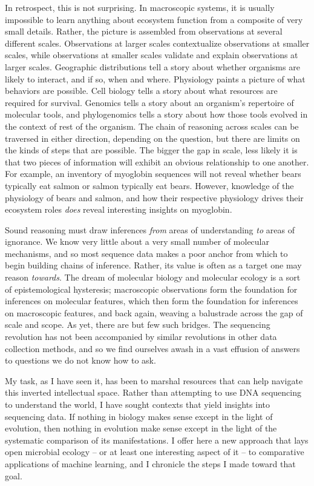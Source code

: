 In retrospect, this is not surprising. In macroscopic systems, it is usually impossible to learn anything about ecosystem function from a composite of very small details. Rather, the picture is assembled from observations at several different scales. Observations at larger scales contextualize observations at smaller scales, while observations at smaller scales validate and explain observations at larger scales. Geographic distributions tell a story about whether organisms are likely to interact, and if so, when and where. Physiology paints a picture of what behaviors are possible. Cell biology tells a story about what resources are required for survival. Genomics tells a story about an organism's repertoire of molecular tools, and phylogenomics tells a story about how those tools evolved in the context of rest of the organism. The chain of reasoning across scales can be traversed in either direction, depending on the question, but there are limits on the kinds of steps that are possible. The bigger the gap in scale, less likely it is that two pieces of information will exhibit an obvious relationship to one another. For example, an inventory of myoglobin sequences will not reveal whether bears typically eat salmon or salmon typically eat bears. However, knowledge of the physiology of bears and salmon, and how their respective physiology drives their ecosystem roles {\em does} reveal interesting insights on myoglobin.

Sound reasoning must draw inferences {\em from} areas of understanding {\em to} areas of ignorance. We know very little about a very small number of molecular mechanisms, and so most sequence data makes a poor anchor from which to begin building chains of inference. Rather, its value is often as a target one may reason {\em towards}. The dream of molecular biology and molecular ecology is a sort of epistemological hysteresis; macroscopic observations form the foundation for inferences on molecular features, which then form the foundation for inferences on macroscopic features, and back again, weaving a balustrade across the gap of scale and scope. As yet, there are but few such bridges. The sequencing revolution has not been accompanied by similar revolutions in other data collection methods, and so we find ourselves awash in a vast effusion of answers to questions we do not know how to ask.

My task, as I have seen it, has been to marshal resources that can help navigate this inverted intellectual space. Rather than attempting to use DNA sequencing to understand the world, I have sought contexts that yield insights into sequencing data. If nothing in biology makes sense except in the light of evolution, then nothing in evolution make sense except in the light of the systematic comparison of its manifestations. I offer here a new approach that lays open microbial ecology -- or at least one interesting aspect of it -- to comparative applications of machine learning, and I chronicle the steps I made toward that goal.

